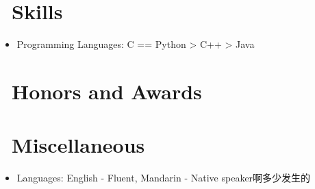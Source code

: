\documentclass{style/resume}
\begin{document}
\section{\faCogs\ Skills}
\begin{itemize}[parsep=0.5ex]
  \item Programming Languages: C == Python > C++ > Java
\end{itemize}

\section{\faCertificate \ Honors and Awards}

\section{\faInfo\ Miscellaneous}
\begin{itemize}[parsep=0.5ex]
  \item Languages: English - Fluent, Mandarin - Native speaker啊多少发生的
\end{itemize}

%
%
\end{document}
